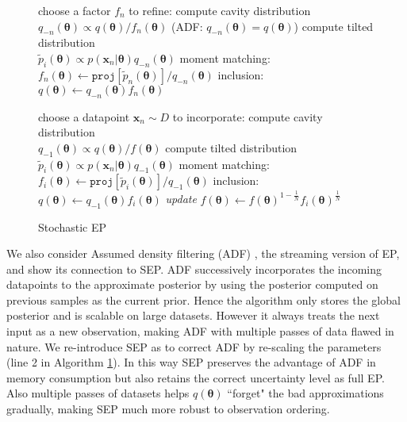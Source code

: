 \begin{figure}[!t]
%
\begin{minipage}[t]{0.48\linewidth}
\centering
\begin{algorithm}[H] 
\caption{EP {\color{gray}(and ADF)}} \small
\label{alg:ep} 
\begin{algorithmic}[1] 
	\STATE choose a factor $f_n$ to refine:
	\STATE compute cavity distribution \\$q_{-n}(\bm{\theta}) \propto q(\bm{\theta}) / f_n(\bm{\theta})$ {\color{gray}(ADF: $q_{-n}(\bm{\theta}) = q(\bm{\theta})$)}
	\STATE compute tilted distribution \\$\tilde{p}_i(\bm{\theta}) \propto p(\bm{x}_n|\bm{\theta}) q_{-n}(\bm{\theta})$
	\STATE moment matching: \\$f_n(\bm{\theta}) \leftarrow \mathtt{proj}[\tilde{p}_n(\bm{\theta})] / q_{-n}(\bm{\theta}) $
	\STATE inclusion: $q(\bm{\theta}) \leftarrow q_{-n}(\bm{\theta}) f_n(\bm{\theta})$
\end{algorithmic}
\end{algorithm}
\end{minipage}
\quad \quad
\begin{minipage}[t]{0.45\linewidth}
\centering
\begin{algorithm}[H]
\caption{Stochastic EP} \small
\label{alg:sep} 
\begin{algorithmic}[1] 
	\STATE choose a datapoint $\bm{x}_n\sim D$ to incorporate:
	\STATE compute cavity distribution \\ $q_{-1}(\bm{\theta}) \propto q(\bm{\theta}) / f(\bm{\theta})$
	\STATE compute tilted distribution \\$\tilde{p}_i(\bm{\theta}) \propto p(\bm{x}_n|\bm{\theta}) q_{-1}(\bm{\theta})$
	\STATE moment matching: \\$f_i(\bm{\theta}) \leftarrow \mathtt{proj}[\tilde{p}_i(\bm{\theta})] / q_{-1}(\bm{\theta}) $
	\STATE inclusion: $q(\bm{\theta}) \leftarrow q_{-1}(\bm{\theta}) f_i(\bm{\theta})$
	\STATE \textit{update} $f(\bm{\theta}) \leftarrow f(\bm{\theta})^{1 - \frac{1}{N}} f_i(\bm{\theta})^{\frac{1}{N}}$
\end{algorithmic}
\end{algorithm}
\end{minipage} 
%
\end{figure}

%
We also consider Assumed density filtering (ADF) \cite{maybeck:adf}\cite{minka:ep}, the streaming version of EP, and show its connection to SEP. ADF successively incorporates the incoming datapoints to the approximate posterior by using the posterior computed on previous samples as the current prior. Hence the algorithm only stores the global posterior and is scalable on large datasets. However it always treats the next input as a new observation, making ADF with multiple passes of data flawed in nature. 
%
We re-introduce SEP as to correct ADF by re-scaling the parameters (line 2 in Algorithm \ref{alg:sep}). In this way SEP preserves the advantage of ADF in memory consumption but also retains the correct uncertainty level as full EP. Also multiple passes of datasets helps $q(\bm{\theta})$ ``forget" the bad approximations gradually, making SEP much more robust to observation ordering. 